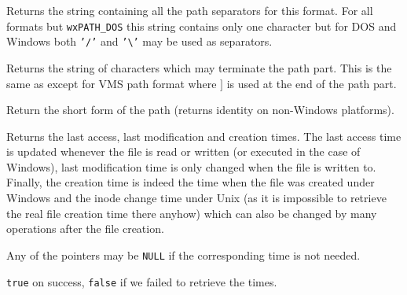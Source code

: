 \label{wxfilenamegetpathseparators}


Returns the string containing all the path separators for this format. For all
formats but {\tt wxPATH\_DOS} this string contains only one character but for
DOS and Windows both {\tt '/'} and {\tt '\textbackslash'} may be used as
separators.




\label{wxfilenamegetpathterminators}


Returns the string of characters which may terminate the path part. This is the
same as  except for VMS
path format where $]$ is used at the end of the path part.


\label{wxfilenamegetshortpath}


Return the short form of the path (returns identity on non-Windows platforms).


\label{wxfilenamegettimes}


Returns the last access, last modification and creation times. The last access
time is updated whenever the file is read or written (or executed in the case
of Windows), last modification time is only changed when the file is written
to. Finally, the creation time is indeed the time when the file was created
under Windows and the inode change time under Unix (as it is impossible to
retrieve the real file creation time there anyhow) which can also be changed
by many operations after the file creation.

Any of the pointers may be {\tt NULL} if the corresponding time is not
needed.


{\tt true} on success, {\tt false} if we failed to retrieve the times.


